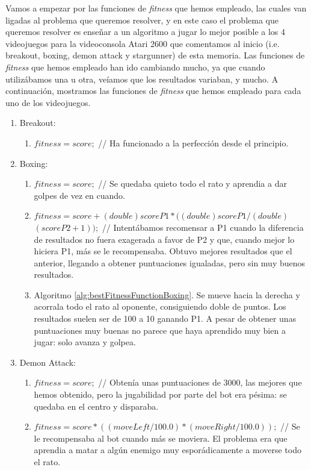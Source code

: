 Vamos a empezar por las funciones de \textit{fitness} que hemos empleado, las cuales van ligadas al problema que queremos resolver, y en este caso el problema que queremos resolver es enseñar a un algoritmo a jugar lo mejor posible a los 4 videojuegos para la videoconsola Atari 2600 que comentamos al inicio (i.e. breakout, boxing, demon attack y stargunner) de esta memoria. Las funciones de \textit{fitness} que hemos empleado han ido cambiando mucho, ya que cuando utilizábamos una u otra, veíamos que los resultados variaban, y mucho. A continuación, mostramos las funciones de \textit{fitness} que hemos empleado para cada uno de los videojuegos.

\begin{enumerate}
    \item Breakout:
    \begin{enumerate}
        \item $fitness = score;$ // Ha funcionado a la perfección desde el principio.
    \end{enumerate}
    \item Boxing:
    \begin{enumerate}
        \item $fitness = score;$ // Se quedaba quieto todo el rato y aprendia a dar golpes de vez en cuando.
        \item $fitness = score + (double)scoreP1 * ((double)scoreP1 / (double)$ $(scoreP2 + 1));$ // Intentábamos recomensar a P1 cuando la diferencia de resultados no fuera exagerada a favor de P2 y que, cuando mejor lo hiciera P1, más se le recompensaba. Obtuvo mejores resultados que el anterior, llegando a obtener puntuaciones igualadas, pero sin muy buenos resultados.
        \item Algoritmo \ref{alg:bestFitnessFunctionBoxing}. Se mueve hacia la derecha y acorrala todo el rato al oponente, consiguiendo doble de puntos. Los resultados suelen ser de 100 a 10 ganando P1. A pesar de obtener unas puntuaciones muy buenas no parece que haya aprendido muy bien a jugar: solo avanza y golpea.
    \end{enumerate}
    \item Demon Attack:
    \begin{enumerate}
        \item $fitness = score;$ // Obtenía unas puntuaciones de 3000, las mejores que hemos obtenido, pero la jugabilidad por parte del bot era pésima: se quedaba en el centro y disparaba.
        \item $fitness = score * ((moveLeft / 100.0) * (moveRight / 100.0));$ // Se le recompensaba al bot cuando más se moviera. El problema era que aprendia a matar a algún enemigo muy esporádicamente a moverse todo el rato.

\end{enumerate}
\end{enumerate}
